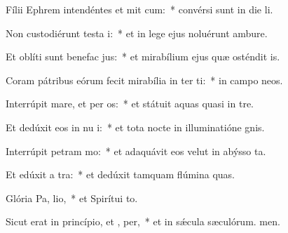 \item Fílii Ephrem intendéntes et mit cum:~* convérsi sunt in die li.
\item Non custodiérunt testa i:~* et in lege ejus noluérunt ambure.
\item Et oblíti sunt benefac jus:~* et mirabílium ejus quæ osténdit is.
\item Coram pátribus eórum fecit mirabília in ter ti:~* in campo neos.
\item Interrúpit mare, et per os:~* et státuit aquas quasi in tre.
\item Et dedúxit eos in nu i:~* et tota nocte in illuminatióne gnis.
\item Interrúpit petram  mo:~* et adaquávit eos velut in abýsso ta.
\item Et edúxit a  tra:~* et dedúxit tamquam flúmina quas.
\item Glória Pa,  lio,~* et Spirítui to.
\item Sicut erat in princípio, et ,  per,~* et in sǽcula sæculórum. men.
